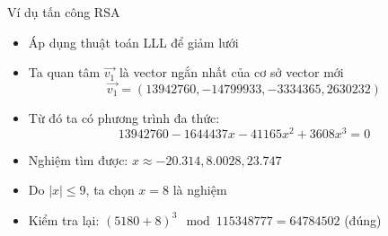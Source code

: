 \begin{frame}{Ví dụ tấn công RSA}

\begin{itemize}
\item Áp dụng thuật toán LLL để giảm lưới



\item Ta quan tâm $\vec{v_1}$ là vector ngắn nhất của cơ sở vector mới
\[
\vec{v_1} = (13942760, -14799933, -3334365, 2630232)
\]
\item Từ đó ta có phương trình đa thức:
\[
13942760 - 1644437x - 41165x^2 + 3608x^3 = 0
\]
\item Nghiệm tìm được: $x \approx -20.314, 8.0028, 23.747$
\item Do $|x| \leq 9$, ta chọn $x = 8$ là nghiệm
\item Kiểm tra lại: $(5180+8)^3 \mod 115348777 = 64784502$ (đúng)
\end{itemize}

\end{frame}
